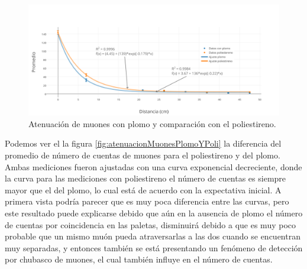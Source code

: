 \documentclass[a4paper,10pt]{article}
\numberwithin{equation}{section}
\begin{document}
\begin{table}[H]
\centering
\caption{Medición con plomo.}
\end{table}


\begin{figure}[H]
 \center 
 \includegraphics[scale=0.4]{atenuacionMuonesPlomoYPoli}
 \caption{Atenuación de muones con plomo y comparación con el poliestireno.}
 \label{fig:atenuacionMuonesPlomoYPoli}
\end{figure}

Podemos ver el la figura \eqref{fig:atenuacionMuonesPlomoYPoli} la diferencia del
promedio de número de cuentas de muones para el poliestireno y del plomo. Ambas 
mediciones fueron ajustadas con una curva exponencial decreciente, donde la curva 
para las mediciones con poliestireno el número de cuentas es siempre mayor que 
el del plomo, lo cual está de acuerdo con la expectativa inicial. A primera vista 
podría parecer que es muy poca diferencia entre las curvas, pero este resultado 
puede explicarse debido que aún en la ausencia de plomo el número de cuentas 
por coincidencia en las paletas, disminuirá debido a que es muy poco probable que 
un mismo muón pueda atraversarlas a las dos cuando se encuentran muy separadas, y 
entonces también se está presentando un fenómeno de detección por chubasco de
muones, el cual también influye en el número de cuentas. 
\end{document}
